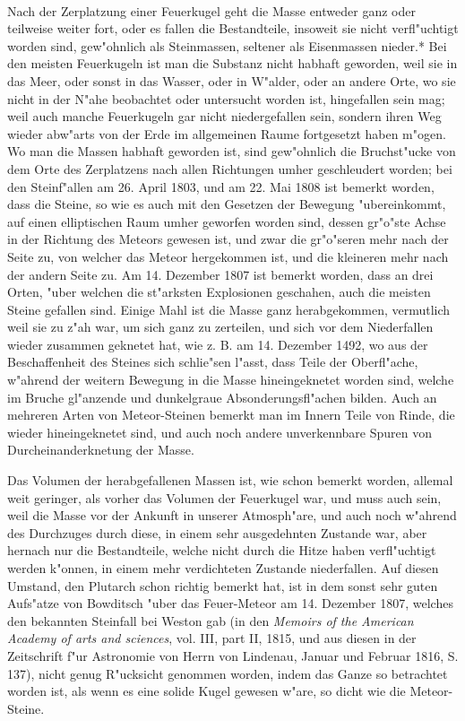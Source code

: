 \documentclass[a4paper, 11pt, oneside, polutonikogreek, german]{article}
\begin{document}
\paragraph{}
Nach der Zerplatzung einer Feuerkugel geht die Masse entweder ganz oder teilweise weiter fort, oder es fallen die Bestandteile, insoweit sie nicht verfl"uchtigt worden sind, gew"ohnlich als Steinmassen, seltener als Eisenmassen nieder.* Bei den meisten Feuerkugeln ist man die Substanz nicht habhaft geworden, weil sie in das Meer, oder sonst in das Wasser, oder in W"alder, oder an andere Orte, wo sie nicht in der N"ahe beobachtet oder untersucht worden ist, hingefallen sein mag; weil auch manche Feuerkugeln gar nicht niedergefallen sein, sondern ihren Weg wieder abw"arts von der Erde im allgemeinen Raume fortgesetzt haben m"ogen. Wo man die Massen habhaft geworden ist, sind gew"ohnlich die Bruchst"ucke von dem Orte des Zerplatzens nach allen Richtungen umher geschleudert worden; bei den Steinf"allen am 26. April 1803, und am 22. Mai 1808 ist bemerkt worden, dass die Steine, so wie es auch mit den Gesetzen der Bewegung "ubereinkommt, auf einen elliptischen Raum umher geworfen worden sind, dessen gr"o"ste Achse in der Richtung des Meteors gewesen ist, und zwar die gr"o"seren mehr nach der Seite zu, von welcher das Meteor hergekommen ist, und die kleineren mehr nach der andern Seite zu. Am 14. Dezember 1807 ist bemerkt worden, dass an drei Orten, "uber welchen die st"arksten Explosionen geschahen, auch die meisten Steine gefallen sind. Einige Mahl ist die Masse ganz herabgekommen, vermutlich weil sie zu z"ah war, um sich ganz zu zerteilen, und sich vor dem Niederfallen wieder zusammen geknetet hat, wie z. B. am 14. Dezember 1492, wo aus der Beschaffenheit des Steines sich schlie"sen l"asst, dass Teile der Oberfl"ache, w"ahrend der weitern Bewegung in die Masse hineingeknetet worden sind, welche im Bruche gl"anzende und dunkelgraue Absonderungsfl"achen bilden. Auch an mehreren Arten von Meteor-Steinen bemerkt man im Innern Teile von Rinde, die wieder hineingeknetet sind, und auch noch andere unverkennbare Spuren von Durcheinanderknetung der Masse.

Das Volumen der herabgefallenen Massen ist, wie schon bemerkt worden, allemal weit geringer, als vorher das Volumen der Feuerkugel war, und muss auch sein, weil die Masse vor der Ankunft in unserer Atmosph"are, und auch noch w"ahrend des Durchzuges durch diese, in einem sehr ausgedehnten Zustande war, aber hernach nur die Bestandteile, welche nicht durch die Hitze haben verfl"uchtigt werden k"onnen, in einem mehr verdichteten Zustande niederfallen. Auf diesen Umstand, den Plutarch schon richtig bemerkt hat, ist in dem sonst sehr guten Aufs"atze von Bowditsch "uber das Feuer-Meteor am 14. Dezember 1807, welches den bekannten Steinfall bei Weston gab (in den \emph{Memoirs of the American Academy of arts and sciences}, vol. III, part II, 1815, und aus diesen in der Zeitschrift f"ur Astronomie von Herrn von Lindenau, Januar und Februar 1816, S. 137), nicht genug R"ucksicht genommen worden, indem das Ganze so betrachtet worden ist, als wenn es eine solide Kugel gewesen w"are, so dicht wie die Meteor-Steine.
\end{document}
